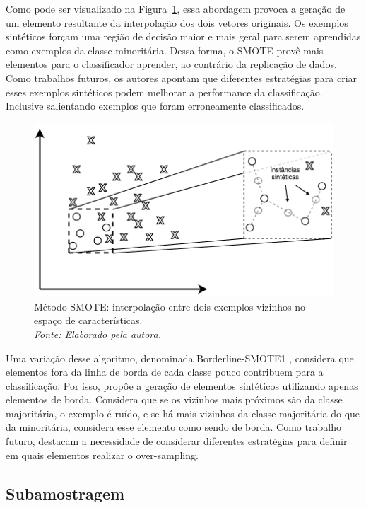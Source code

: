 Como pode ser visualizado na Figura~\ref{fig:smote}, essa abordagem provoca a geração de um elemento resultante da interpolação dos dois vetores originais. Os exemplos sintéticos forçam uma região de decisão maior e mais geral para serem aprendidas como exemplos da classe minoritária. Dessa forma, o SMOTE provê mais elementos para o classificador aprender, ao contrário da replicação de dados. Como trabalhos futuros, os autores apontam que diferentes estratégias para criar esses exemplos sintéticos podem melhorar a performance da classificação. Inclusive salientando exemplos que foram erroneamente classificados.

\begin{figure}[!htbp]
  \begin{center}
    \includegraphics[width=0.7\linewidth]{figuras/smote.pdf}
  \end{center}
  \caption[Método SMOTE: interpolação entre dois exemplos vizinhos no espaço de características.]{Método SMOTE: interpolação entre dois exemplos vizinhos no espaço de características. \\ \textit{Fonte: Elaborado pela autora.}}
  \label{fig:smote}
\end{figure}

Uma variação desse algoritmo, denominada Borderline-SMOTE1 \cite{Han2005}, considera que elementos fora da linha de borda de cada classe pouco contribuem para a classificação. Por isso, propôe a geração de elementos sintéticos utilizando apenas elementos de borda. Considera que se os vizinhos mais próximos são da classe majoritária, o exemplo é ruído, e se há mais vizinhos da classe majoritária do que da minoritária, considera esse elemento como sendo de borda. Como trabalho futuro, destacam a necessidade de considerar diferentes estratégias para definir em quais elementos realizar o over-sampling.


\subsection{Subamostragem}

